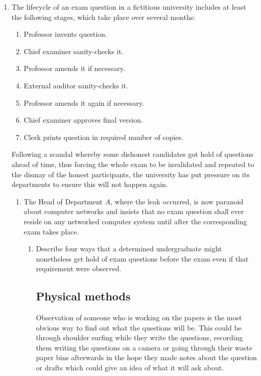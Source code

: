 \documentclass[10pt,\jkfside,a4paper]{article}
\begin{document}
\begin{enumerate}

\item The lifecycle of an exam question in a fictitious university includes at least the following 
stages, which take place over several months:

\begin{enumerate}[label=(\roman*)]
\item Professor invents question.
\item Chief examiner sanity-checks it.
\item Professor amends it if necessary.
\item External auditor sanity-checks it.
\item Professor amends it again if necessary.
\item Chief examiner approves final version.
\item Clerk prints question in required number of copies.
\end{enumerate}

Following a scandal whereby some dishonest candidates got hold of questions ahead of time, 
thus forcing the whole exam to be invalidated and repeated to the dismay of the honest 
participants, the university has put pressure on its departments to ensure this will not 
happen again.

\begin{enumerate}

\item The Head of Department $A$, where the leak occurred, is now paranoid about computer 
networks and insists that no exam question shall ever reside on any networked computer 
system until after the corresponding exam takes place.

\begin{enumerate}[label=(\roman*)]

\item Describe four ways that a determined undergraduate might nonetheless get hold of exam 
questions before the exam even if that requirement were observed.

\subsection*{Physical methods}

Observation of someone who is working on the papers is the most obvious way to find
out what the questions will be. This could be through shoulder surfing
while they write the questions, recording them writing the questions on a camera
or going through their waste paper bins afterwards in the hope they made notes about the
question or drafts which could give an idea of what it will ask about.


\end{enumerate}
\end{enumerate}
\end{enumerate}
\end{document}
